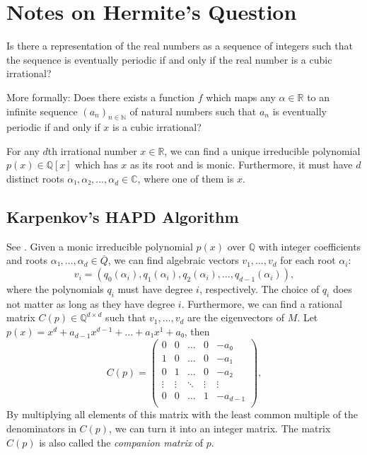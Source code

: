 \documentclass[english,version-2020-11]{uzl-thesis}
\begin{document}

\chapter{Notes on Hermite's Question}


\begin{problem}
  Is there a representation of the real numbers as a sequence of integers such
  that the sequence is eventually periodic if and only if the real number is a
  cubic irrational?
\end{problem}

More formally: Does there exists a function $f$ which maps any $α ∈ ℝ$ to an
infinite sequence $(a_n)_{n ∈ ℕ}$ of natural numbers such that $a_n$ is
eventually periodic if and only if $x$ is a cubic irrational?

For any $d$th irrational number $x ∈ ℝ$, we can find a unique irreducible polynomial $p(x) ∈ ℚ[x]$
which has $x$ as its root and is monic.
Furthermore, it must have $d$ distinct roots $α₁, α₂, \dots, α_d ∈ ℂ$,
where one of them is $x$.

\section{Karpenkov's HAPD Algorithm}

See \cite{Karpenkov2024}.
Given a monic irreducible polynomial $p(x)$ over $ℚ$ with integer coefficients and roots $α₁, \dots, α_d ∈ \overline{Q}$,
we can find algebraic vectors $v_1, \dots, v_d$ for each root $α_i$:
\[
  v_i = (q_0(α_i), q_1(α_i), q_2(α_i), \dots, q_{d-1}(α_i)),
\]
where the polynomials $q_i$ must have degree $i$, respectively.
The choice of $q_i$ does not matter as long as they have degree $i$.
Furthermore, we can find a rational matrix $C(p) ∈ ℚ^{d × d}$ such that $v_1, \dots, v_d$ are the eigenvectors of $M$.
Let $p(x) = x^d + a_{d-1} x^{d-1} + \dots + a₁ x^1 + a₀$, then
\[
  C(p) =
  \begin{pmatrix}
    0 & 0 & \dots & 0 & -a₀ \\
    1 & 0 & \dots & 0 & -a₁ \\
    0 & 1 & \dots & 0 & -a₂ \\
    \vdots & \vdots & \ddots & \vdots & \vdots \\
    0 & 0 & \dots & 1 & -a_{d-1} \\
  \end{pmatrix},
\]
By multiplying all elements of this matrix with the least common multiple of the denominators in $C(p)$,
we can turn it into an integer matrix.
The matrix $C(p)$ is also called the \emph{companion matrix} of $p$.
\end{document}
